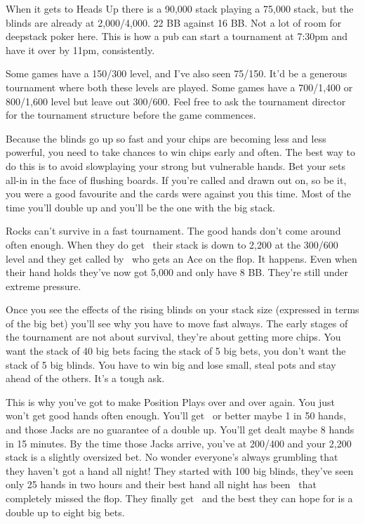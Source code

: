 When it gets to Heads Up there is a 90,000 stack
playing a 75,000 stack, but the blinds are already at 2,000/4,000.
22 BB against 16 BB. Not a lot of room for deepstack
poker here. This is how a pub can start a tournament at 7:30pm and
have it over by 11pm, consistently.

Some games have a 150/300 level, and I've also seen 75/150. It'd be
a generous tournament where both these levels are played. Some games
have a 700/1,400 or 800/1,600 level but leave out 300/600. Feel
free to ask the tournament director for the tournament structure before
the game commences.

Because the blinds go up so fast and your chips are becoming less and
less powerful, you need to take chances to win chips early and often.
The best way to do this is to avoid slowplaying your strong but
vulnerable hands. Bet your sets all-in in the face of flushing boards.
If you're called and drawn out on, so be it, you were a good favourite
and the cards were against you this time. Most of the time you'll double
up and you'll be the one with the big stack.

Rocks can't survive in a fast tournament. The good hands don't come
around often enough. When they do get \Ks\Kc\ their stack is down to 2,200 at
the 300/600 level and they get called by \Ad\Qd\ who gets an Ace on the flop.
It happens. Even when their hand holds they've now got 5,000 and only have
8 BB. They're still under extreme pressure.

Once you see the effects of the rising blinds on your stack size
(expressed in terms of the big bet) you'll see why you have to move
fast always. The early stages of the tournament are not about survival,
they're about getting more chips. You want the stack of 40 big bets facing
the stack of 5 big bets, you don't want the stack of 5 big blinds. You
have to win big and lose small, steal pots and stay ahead of the others.
It's a tough ask.

This is why you've got to make Position Plays over and over again.
You just won't get good hands often enough. You'll get \Js\Jc\ or better
maybe 1 in 50 hands, and those Jacks are no guarantee of a double up.
You'll get dealt maybe 8 hands in 15 minutes.
By the time those Jacks arrive, you've at 200/400 and your 2,200 stack is
a slightly oversized bet. No wonder everyone's always grumbling that
they haven't got a hand all night! They started with 100 big blinds,
they've seen only 25 hands in two hours and their best hand all
night has been \Jd\nined\ that completely missed the flop.
They finally get \Js\Jc\ and the best they can hope for is a double
up to eight big bets.

